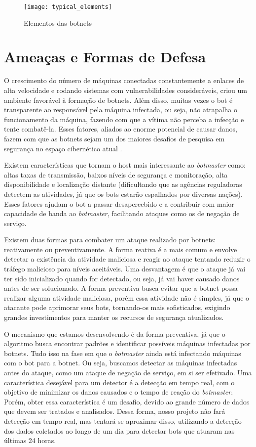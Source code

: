 \begin{figure}
\texttt{[image: typical\_elements]}
\caption[Elementos das botnets]{Elementos das botnets \citep{silva2013botnets}} \label{fig:typical_elements}
\end{figure}

\section{Ameaças e Formas de Defesa}
O crescimento do número de máquinas conectadas constantemente a enlaces de alta velocidade e rodando sistemas com vulnerabilidades consideráveis, criou um ambiente favorável à formação de botnets. Além disso, muitas vezes o bot é transparente ao responsável pela máquina infectada, ou seja, não atrapalha o funcionamento da máquina, fazendo com que a vítima não perceba a infecção e tente combatê-la. Esses fatores, aliados ao enorme potencial de causar danos, fazem com que as botnets sejam um dos maiores desafios de pesquisa em segurança no espaço cibernético atual \citep{soltani2014survey}.

Existem características que tornam o host mais interessante ao \textit{botmaster} como: altas taxas de transmissão, baixos níveis de segurança e monitoração, alta disponibilidade e localização distante (dificultando que as agências reguladoras detectem as atividades, já que os bots estarão espalhados por diversas nações). Esses fatores ajudam o bot a passar desapercebido e a contribuir com maior capacidade de banda ao \textit{botmaster}, facilitando ataques como os de negação de serviço.

Existem duas formas para combater um ataque realizado por botnets: reativamente ou preventivamente. A forma reativa é a mais comum e envolve detectar a existência da atividade maliciosa e reagir ao ataque tentando reduzir o tráfego malicioso para níveis aceitáveis. Uma desvantagem é que o ataque já vai ter sido inicializado quando for detectado, ou seja, já vai haver causado danos antes de ser solucionado. A forma preventiva busca evitar que a botnet possa realizar alguma atividade maliciosa, porém essa atividade não é simples, já que o atacante pode aprimorar seus bots, tornando-os mais sofisticados, exigindo grandes investimentos para manter os recursos de segurança atualizados.

O mecanismo que estamos desenvolvendo é da forma preventiva, já que o algoritmo busca encontrar padrões e identificar possíveis máquinas infectadas por botnets. Tudo isso na fase em que o \textit{botmaster} ainda está infectando máquinas com o bot para a botnet. Ou seja, buscamos detectar as máquinas infectadas antes do ataque, como um ataque de negação de serviço, em si ser efetivado. Uma característica desejável para um detector é a detecção em tempo real, com o objetivo de minimizar os danos causados e o tempo de reação do \textit{botmaster}. Porém, obter essa característica é um desafio, devido ao grande número de dados que devem ser tratados e analisados. Dessa forma, nosso projeto não fará detecção em tempo real, mas tentará se aproximar disso, utilizando a detecção dos dados coletados ao longo de um dia para detectar bots que atuaram nas últimas 24 horas.

